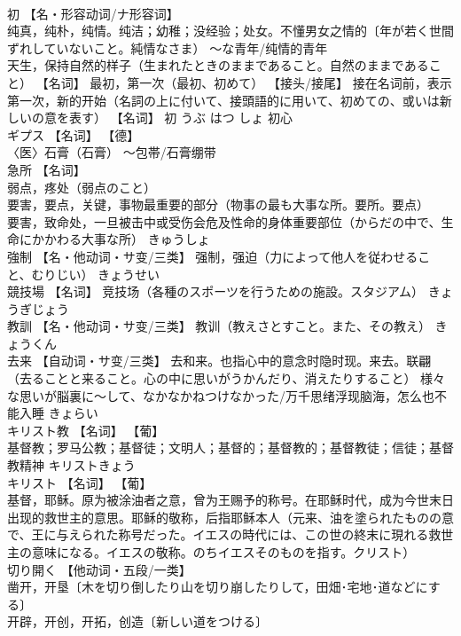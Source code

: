\documentclass[8pt]{extreport}
\begin{document}
\begin{CJK}{UTF8}{min}
\\	初	【名・形容动词/ナ形容词】 
\\	纯真，纯朴，纯情。纯洁；幼稚；没经验；处女。不懂男女之情的〔年が若く世間ずれしていないこと。純情なさま） 〜な青年/纯情的青年 
\\	天生，保持自然的样子（生まれたときのままであること。自然のままであること） 【名词】 最初，第一次（最初、初めて） 【接头/接尾】 接在名词前，表示第一次，新的开始（名詞の上に付いて、接頭語的に用いて、初めての、或いは新しいの意を表す） 【名词】 初	うぶ はつ しょ	初心
\\	ギプス	【名词】 【德】
\\	〈医〉石膏（石膏） ～包帯/石膏绷带		
\\	急所	【名词】 
\\	弱点，疼处（弱点のこと） 
\\	要害，要点，关键，事物最重要的部分（物事の最も大事な所。要所。要点） 
\\	要害，致命处，一旦被击中或受伤会危及性命的身体重要部位（からだの中で、生命にかかわる大事な所）	きゅうしょ	
\\	強制	【名・他动词・サ变/三类】 强制，强迫（力によって他人を従わせること、むりじい）	きょうせい	
\\	競技場	【名词】 竞技场（各種のスポーツを行うための施設。スタジアム）	きょうぎじょう	
\\	教訓	【名・他动词・サ变/三类】 教训（教えさとすこと。また、その教え）	きょうくん	
\\	去来	【自动词・サ变/三类】 去和来。也指心中的意念时隐时现。来去。联翩（去ることと来ること。心の中に思いがうかんだり、消えたりすること） 様々な思いが脳裏に～して、なかなかねつけなかった/万千思绪浮现脑海，怎么也不能入睡	きょらい	
\\	キリスト教	【名词】 【葡】
\\	基督教；罗马公教；基督徒；文明人；基督的；基督教的；基督教徒；信徒；基督教精神	キリストきょう	
\\	キリスト	【名词】 【葡】
\\	基督，耶稣。原为被涂油者之意，曾为王赐予的称号。在耶稣时代，成为今世末日出现的救世主的意思。耶稣的敬称，后指耶稣本人（元来、油を塗られたものの意で、王に与えられた称号だった。イエスの時代には、この世の終末に現れる救世主の意味になる。イエスの敬称。のちイエスそのものを指す。クリスト）		
\\	切り開く	【他动词・五段/一类】 
\\	凿开，开垦〔木を切り倒したり山を切り崩したりして，田畑･宅地･道などにする〕 
\\	开辟，开创，开拓，创造〔新しい道をつける〕 

\end{CJK}
\end{document}
